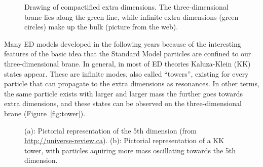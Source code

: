 \begin{figure}[htb]\begin{center}
	\caption{Drawing of compactified extra dimensions. 
          The three-dimensional brane lies along the green
          line, while infinite extra dimensions (green circles)
          make up the bulk (picture from the web). \label{fig:compact}}
\end{center}\end{figure}


Many ED models developed in the following years
because of the interesting features of the
basic idea that the Standard Model particles are confined
to our three-dimensional brane.
In general, in most of ED theories Kaluza-Klein (KK) states
appear. These are infinite modes, also called ``towers'', 
existing for every particle
that can propagate to the extra dimensions as resonances.
In other terms, the same particle exists with larger and
larger mass the further goes towards extra dimensions, and
these states can be observed on the three-dimensional brane
(Figure~\ref{fig:tower}).


\begin{figure}[htb]\begin{center}
	\caption{(a): Pictorial representation of
          the 5th dimension (from \url{http://universe-review.ca}). 
          (b): Pictorial representation of a KK tower, with 
        particles aquiring more mass oscillating towards the
        5th dimension.}
\end{center}\end{figure}

